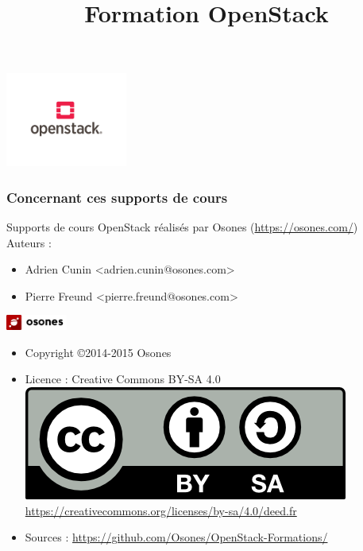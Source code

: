\usepackage[utf8]{inputenc}
\usepackage{graphicx}
\usepackage{xparse}
\usepackage{microtype}
\usepackage{verbatim}


\title{Formation OpenStack}



  \begin{frame}
    \titlepage
    \begin{center}
      \includegraphics[width=4cm]{images/openstack.png}
    \end{center}
  \end{frame}

  \begin{frame}
    \frametitle{Concernant ces supports de cours}
    Supports de cours OpenStack réalisés par Osones (\url{https://osones.com/})\\
    Auteurs :
    \begin{itemize}
      \item Adrien Cunin \textless adrien.cunin@osones.com\textgreater
      \item Pierre Freund \textless pierre.freund@osones.com\textgreater
    \end{itemize}
    \begin{center}
      \includegraphics[height=0.5cm]{images/logo-osones.png}
    \end{center}
    \begin{itemize}
      \item Copyright \copyright{2014-2015 Osones}
      \item Licence : Creative Commons BY-SA 4.0 \\
        \includegraphics{images/licence.png} \\
        \url{https://creativecommons.org/licenses/by-sa/4.0/deed.fr}
      \item Sources : \url{https://github.com/Osones/OpenStack-Formations/}
    \end{itemize}
  \end{frame}

